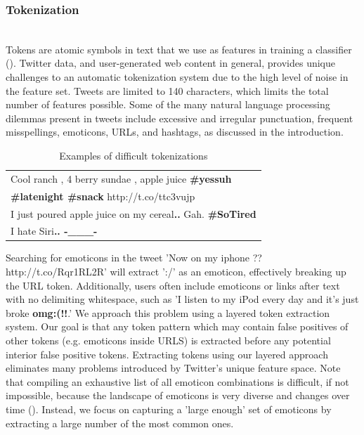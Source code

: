 \documentclass[letterpaper]{article}
\begin{document}
\subsubsection{Tokenization}
~\\
Tokens are atomic symbols in text that we use as features in training a classifier (\citeauthor{Laboreiro:2010:TMM:1871840.1871853}). Twitter data, and user-generated web content in general, provides unique challenges to an automatic tokenization system due to the high level of noise in the feature set. Tweets are limited to 140 characters, which limits the total number of features possible. Some of the many natural language processing dilemmas present in tweets include excessive and irregular punctuation, frequent misspellings, emoticons, URLs, and hashtags, as discussed in the introduction.\\

\begin{table}[h]
\centering
\begin{tabular}{|l|}
	\hline
	Cool ranch , 4 berry sundae , apple juice \textbf{\#yessuh} \\ 
	\textbf{\#latenight \#snack} http://t.co/ttc3vujp \\ \hline
	I just poured apple juice on my cereal\textbf{..} Gah. \textbf{\#SoTired} \\ \hline
	I hate Siri\textbf{.. -\_\_\_-} \\
	\hline
\end{tabular}
\caption{Examples of difficult tokenizations}
\label{tab:tokenization_examples}
\end{table}

Searching for emoticons in the tweet 'Now on my iphone ?? http://t.co/Rqr1RL2R' will extract ':/' as an emoticon, effectively breaking up the URL token. Additionally, users often include emoticons or links after text with no delimiting whitespace, such as 'I listen to my iPod every day and it's just broke \textbf{omg:(!!}.' We approach this problem using a layered token extraction system. Our goal is that any token pattern which may contain false positives of other tokens (e.g. emoticons inside URLS) is extracted before any potential interior false positive tokens. Extracting tokens using our layered approach eliminates many problems introduced by Twitter's unique feature space. Note that compiling an exhaustive list of all emoticon combinations is difficult, if not impossible, because the landscape of emoticons is very diverse and changes over time (\citeauthor{Laboreiro:2010:TMM:1871840.1871853}). Instead, we focus on capturing a 'large enough' set of emoticons by extracting a large number of the most common ones. \\
\end{document}
